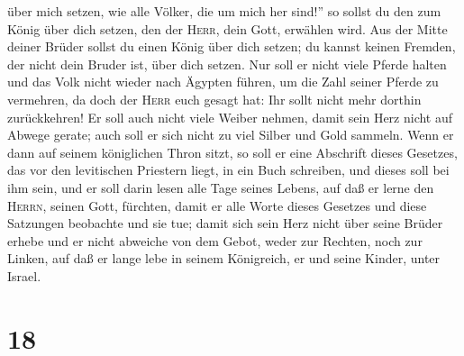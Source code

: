 über mich setzen, wie alle Völker, die um mich her sind!''
 so sollst du den zum König über dich setzen, den der
\textsc{Herr}, dein Gott, erwählen wird. Aus der Mitte deiner Brüder
sollst du einen König über dich setzen; du kannst keinen Fremden, der
nicht dein Bruder ist, über dich setzen.  Nur soll er
nicht viele Pferde halten und das Volk nicht wieder nach Ägypten führen,
um die Zahl seiner Pferde zu vermehren, da doch der \textsc{Herr} euch
gesagt hat: Ihr sollt nicht mehr dorthin zurückkehren! 
Er soll auch nicht viele Weiber nehmen, damit sein Herz nicht auf Abwege
gerate; auch soll er sich nicht zu viel Silber und Gold sammeln.
 Wenn er dann auf seinem königlichen Thron sitzt, so soll
er eine Abschrift dieses Gesetzes, das vor den levitischen Priestern
liegt, in ein Buch schreiben,  und dieses soll bei ihm
sein, und er soll darin lesen alle Tage seines Lebens, auf daß er lerne
den \textsc{Herrn}, seinen Gott, fürchten, damit er alle Worte dieses
Gesetzes und diese Satzungen beobachte und sie tue; 
damit sich sein Herz nicht über seine Brüder erhebe und er nicht
abweiche von dem Gebot, weder zur Rechten, noch zur Linken, auf daß er
lange lebe in seinem Königreich, er und seine Kinder, unter Israel.

\hypertarget{section-17}{%
\section{18}\label{section-17}}

